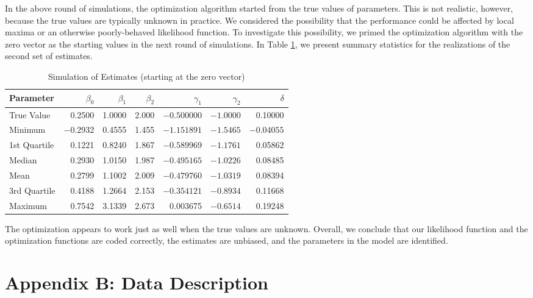 \documentclass[11pt]{paper}
\begin{document}
In the above round of simulations, the optimization algorithm started from 
the true values of parameters.  
This is not realistic, however, because the true values are typically unknown 
in practice.  
We considered the possibility that the performance could be affected by local 
maxima or an otherwise poorly-behaved likelihood function. 
To investigate this possibility, we primed the optimization algorithm with the 
zero vector as the starting values in the next round of simulations.
In Table \ref{tab:sim_cold}, we present summary statistics for the 
realizations of the second set of estimates. 
% 
\begin{table}[ht]
\centering
\begin{tabular}{l r r r r r r}
  \hline
	Parameter 	& $\beta_0$	& $\beta_1$	& $\beta_2$	& $\gamma_1$	& $\gamma_2$	& $\delta$ \\ 
  \hline
	True Value 	&  0.2500 		&   1.0000 	&   2.000 		& $-0.500000$		&  $-1.0000$		&   0.10000  \\
  \hline
 	Minimum		& $-0.2932$	&   0.4555 	&   1.455 		&  $-1.151891$		&  $-1.5465$ 		& $-0.04055$ \\
 	1st Quartile	&   0.1221 	&   0.8240 	&   1.867 		&  $-0.589969$		&  $-1.1761$ 		&   0.05862  \\
 	Median 		&   0.2930 	&   1.0150 	&   1.987 		&  $-0.495165$		&  $-1.0226$ 		&   0.08485  \\
 	Mean   		&   0.2799 	&   1.1002 	&   2.009 		&  $-0.479760$		&  $-1.0319$ 		&   0.08394  \\
 	3rd Quartile	&   0.4188 	&   1.2664 	&   2.153 		&   $-0.354121$	&  $-0.8934$ 		&   0.11668  \\
 	Maximum   	&   0.7542 	&   3.1339 	&   2.673 		&    0.003675 		&  $-0.6514$ 		&   0.19248  \\
   \hline
\end{tabular}
\caption{Simulation of Estimates (starting at the zero vector)} 
\label{tab:sim_cold}
\end{table}
% 
The optimization appears to work just as well when the true values are unknown. 
Overall, we conclude that our likelihood function 
and the optimization functions are coded correctly, 
the estimates are unbiased, 
and the parameters in the model are identified. 


\section{Appendix B: Data Description}
\end{document}

